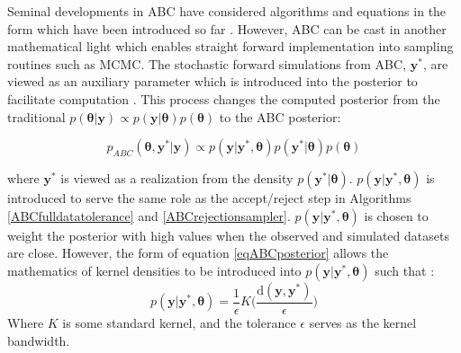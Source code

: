 Seminal developments in ABC have considered algorithms and equations in the form which have been introduced so far \citep{Fu1997,Pritchard1999a,Beaumont2002,Marjoram2003}. However, ABC can be cast in another mathematical light which enables straight forward implementation into sampling routines such as MCMC. The stochastic forward simulations from ABC, $\bm{y^*}$, are viewed as an auxiliary parameter which is introduced into the posterior to facilitate computation \citep{Sisson2010a}. This process changes the computed posterior from the traditional $p(\bm{\theta}|\bm{y}) \propto p(\bm{y}|\bm{\theta})p(\bm{\theta})$ to the ABC posterior:

\begin{equation}
p_{ABC}(\bm{\theta},\bm{y^*}|\bm{y}) \propto p(\bm{y}|\bm{y^*},\bm{\theta}) p(\bm{y^*}|\bm{\theta}) p(\bm{\theta})
\label{eqABCposterior}
\end{equation}

where $\bm{y^*}$ is viewed as a realization from the density $p(\bm{y^*}|\bm{\theta})$. $p(\bm{y}|\bm{y^*},\bm{\theta})$ is introduced to serve the same role as the accept/reject step in Algorithms \ref{ABCfulldatatolerance} and \ref{ABCrejectionsampler}. $p(\bm{y}|\bm{y^*},\bm{\theta})$ is chosen to weight the posterior with high values when the observed and simulated datasets are close. However, the form of equation \ref{eqABCposterior} allows the mathematics of kernel densities to be introduced into $p(\bm{y}|\bm{y^*},\bm{\theta})$ such that \citep{Sisson2010a}:
\begin{equation}
p(\bm{y}|\bm{y^*},\bm{\theta}) = \frac{1}{\epsilon} K \Big(\frac{\text{d}(\bm{y},\bm{y^*})}{\epsilon}\Big)
\label{generic-weighting-kernel}
\end{equation}
Where $K$ is some standard kernel, and the tolerance $\epsilon$ serves as the kernel bandwidth. \par

